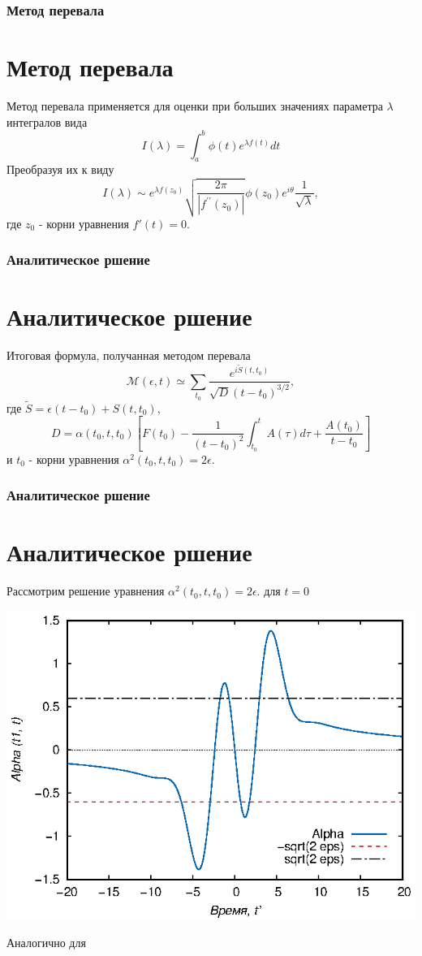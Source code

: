 \documentclass{beamer}
\newcommand{\cM}{\mathcal{M}}
\begin{document}
\frame
{
	\frametitle{Метод перевала}
	\section{Метод перевала}
	Метод перевала применяется для оценки при больших значениях параметра $\lambda$ интегралов вида
	\begin{equation}\nonumber
	I(\lambda) = \int_{a}^{b}\phi(t)e^{\lambda f(t)}dt
	\end{equation}
	Преобразуя их к виду
	\begin{equation}\nonumber
	I(\lambda) \sim e^{\lambda f (z_0)}\sqrt{\frac{2\pi}{|f^{\prime \prime} (z_0)|}} \phi(z_0) e^{i \theta} \frac{1}{\sqrt{\lambda}},
	\end{equation}
	где $z_0$ - корни уравнения $f'(t) = 0$.
}

\frame
{
	\frametitle{Аналитическое ршение}
	\section{Аналитическое ршение}
	Итоговая формула, получанная методом перевала
	\begin{equation}
	\cM(\epsilon, t) \simeq \sum_{t_0}\frac{e^{i\widetilde{S}(t, t_0)} }{\sqrt{D} (t-t_0)^{3/2}},
	\end{equation}
	где $\widetilde{S} = \epsilon (t - t_0) + S(t, t_0)$,
	$$
	D = \alpha(t_0, t, t_0)\left[F(t_0) - \frac{1}{(t - t_0)^2} \int_{t_0}^{t}A(\tau)d\tau +  \frac{A(t_0)}{t-t_0} \right]
	$$
	и $t_0$ - корни уравнения $\alpha ^2 (t_0, t, t_0) = 2 \epsilon$.
}

\frame
{
	\frametitle{Аналитическое ршение}
	\section{Аналитическое ршение}
	Рассмотрим решение уравнения $\alpha ^2 (t_0, t, t_0) = 2 \epsilon.$ для $t = 0$
	\begin{center}
		\includegraphics{alpha-200}  
	\end{center}
	Аналогично для 
	
}

\frame
{
	\titlepage 
	\small{}
} 
\end{document}
